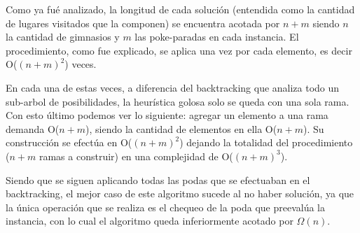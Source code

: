 Como ya fué analizado, la longitud de cada solución (entendida como la cantidad de lugares visitados que la componen) se encuentra acotada por $n + m$ siendo $n$ la cantidad de gimnasios y $m$ las poke-paradas en cada instancia. El procedimiento, como fue explicado, se aplica una vez por cada elemento, es decir O($(n+m)^{2}$) veces.

En cada una de estas veces, a diferencia del backtracking que analiza todo un sub-arbol de posibilidades, la heur\'istica golosa solo se queda con una sola rama. Con esto último podemos ver lo siguiente: agregar un elemento a una rama demanda O($n+m$), siendo la cantidad de elementos en ella O($n+m$). Su construcción se efectúa en O($(n+m)^2$) dejando la totalidad del procedimiento ($n+m$ ramas a construir) en una complejidad de O($(n+m)^3$).

Siendo que se siguen aplicando todas las podas que se efectuaban en el backtracking, el mejor caso de este algoritmo sucede al no haber solución, ya que la única operación que se realiza es el chequeo de la poda que preevalúa la instancia, con lo cual el algoritmo queda inferiormente acotado por $\Omega(n)$.